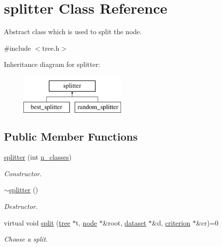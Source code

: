 \hypertarget{classsplitter}{\section{splitter Class Reference}
\label{classsplitter}
}


Abstract class which is used to split the node.  




{\ttfamily \#include $<$tree.\+h$>$}

Inheritance diagram for splitter\+:\begin{figure}[H]
\begin{center}
\leavevmode
\includegraphics[height=2.000000cm]{classsplitter}
\end{center}
\end{figure}
\subsection*{Public Member Functions}
\begin{DoxyCompactItemize}
\item 
\hyperlink{classsplitter_aecf4cc04f2ae39a4a8e13d4049d442cf}{splitter} (int \hyperlink{classsplitter_abfc53538ed65c0afd50aedbf46dff458}{n\+\_\+classes})
\begin{DoxyCompactList}\small\item\em Constructor. \end{DoxyCompactList}\item 
\hyperlink{classsplitter_a221bcb6b6705bb240ef6eea0c95f841a}{$\sim$splitter} ()
\begin{DoxyCompactList}\small\item\em Destructor. \end{DoxyCompactList}\item 
virtual void \hyperlink{classsplitter_af592533ea2d8d16337fa6c8a9a0a6b36}{split} (\hyperlink{classtree}{tree} $\ast$t, \hyperlink{classnode}{node} $\ast$\&root, \hyperlink{classdataset}{dataset} $\ast$\&d, \hyperlink{classcriterion}{criterion} $\ast$\&cr)=0
\begin{DoxyCompactList}\small\item\em Choose a split. \end{DoxyCompactList}\end{DoxyCompactItemize}
